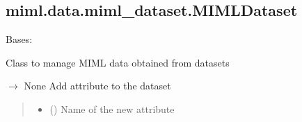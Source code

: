 \documentclass[letterpaper,10pt,english]{sphinxmanual}
\begin{document}
\sphinxstepscope


\subsection{miml.data.miml\_dataset.MIMLDataset}
\label{\detokenize{data/_autosummary/miml.data.miml_dataset.MIMLDataset:miml-data-miml-dataset-mimldataset}}\label{\detokenize{data/_autosummary/miml.data.miml_dataset.MIMLDataset::doc}}

\begin{fulllineitems}
\label{\detokenize{data/_autosummary/miml.data.miml_dataset.MIMLDataset:miml.data.miml_dataset.MIMLDataset}}
\pysigstartsignatures
\pysigline
{}
\pysigstopsignatures
\sphinxAtStartPar
Bases: 

\sphinxAtStartPar
Class to manage MIML data obtained from datasets

\begin{fulllineitems}
\label{\detokenize{data/_autosummary/miml.data.miml_dataset.MIMLDataset:miml.data.miml_dataset.MIMLDataset.add_attribute}}
\pysigstartsignatures
\pysiglinewithargsret
{}
{\sphinxparamcomma {}\sphinxparamcomma {}\sphinxparamcomma {}}
{{ $\rightarrow$ None}}
\pysigstopsignatures
\sphinxAtStartPar
Add attribute to the dataset
\begin{quote}\begin{description}
\begin{itemize}
\item {} 
\sphinxAtStartPar
{} () \textendash{} Name of the new attribute


\end{itemize}
\end{description}
\end{quote}
\end{fulllineitems}
\end{fulllineitems}
\end{document}
